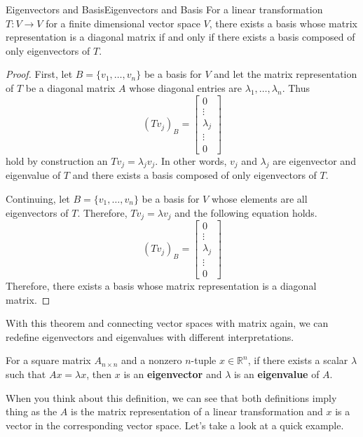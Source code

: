 \documentclass[../main.tex]{subfiles}
\begin{document}
\begin{theorem}{Eigenvectors and Basis}{Eigenvectors and Basis}
For a linear transformation $T: V \to V$ for a finite dimensional
vector space $V$, there exists a basis whose matrix representation
is a diagonal matrix if and only if there exists a basis composed
of only eigenvectors of $T$.
\end{theorem}
\begin{proof}
First, let $B = \{ v_1, \ldots, v_n \}$ be a basis for $V$ and let
the matrix representation of $T$ be a diagonal matrix $A$ whose
diagonal entries are $\lambda_1, \ldots, \lambda_n$. Thus
\[
(Tv_j)_B =
\begin{bmatrix}
    0 \\
    \vdots \\
    \lambda_j \\
    \vdots \\
    0
\end{bmatrix}
\]
hold by construction an $Tv_j = \lambda_j v_j$. In other words,
$v_j$ and $\lambda_j$ are eigenvector and eigenvalue of $T$ and
there exists a basis composed of only eigenvectors of $T$.

Continuing, let $B = \{ v_1, \ldots, v_n \}$ be a basis for $V$ whose
elements are all eigenvectors of $T$. Therefore, $Tv_j = \lambda v_j$
and the following equation holds.
\[
(Tv_j)_B =
\begin{bmatrix}
    0 \\
    \vdots \\
    \lambda_j \\
    \vdots \\
    0
\end{bmatrix}
\]
Therefore, there exists a basis whose matrix representation is a
diagonal matrix.
\end{proof}

With this theorem and connecting vector spaces with matrix again,
we can redefine eigenvectors and eigenvalues with different
interpretations.

\begin{definition}
For a square matrix $A_{n \times n}$ and a nonzero $n$-tuple $x \in
\mathbb{R}^n$, if there exists a scalar $\lambda$ such that
$Ax = \lambda x$, then $x$ is an \textbf{eigenvector} and $\lambda$
is an \textbf{eigenvalue} of $A$.
\end{definition}

When you think about this definition, we can see that both definitions
imply thing as the $A$ is the matrix representation of a linear
transformation and $x$ is a vector in the corresponding vector space.
Let's take a look at a quick example.
\end{document}
